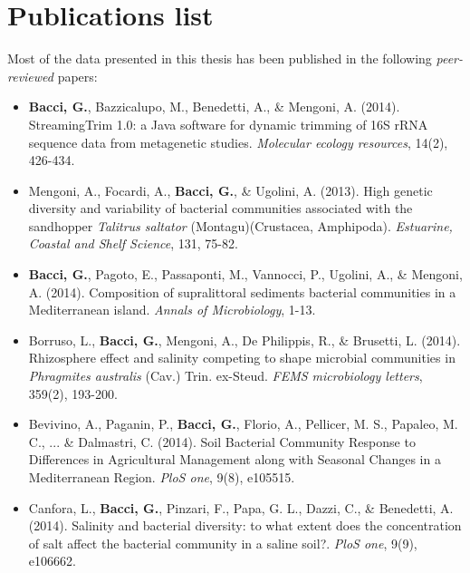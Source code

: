 
\chapter{Publications list}

Most of the data presented in this thesis has been published in the following \textit{peer-reviewed} papers:
\begin{itemize}

\item \textbf{Bacci, G.}, Bazzicalupo, M., Benedetti, A., \& Mengoni, A. (2014). StreamingTrim 1.0: a Java software for dynamic trimming of 16S rRNA sequence data from metagenetic studies. \textit{Molecular ecology resources}, 14(2), 426-434.

\item Mengoni, A., Focardi, A., \textbf{Bacci, G.}, \& Ugolini, A. (2013). High genetic diversity and variability of bacterial communities associated with the sandhopper \textit{Talitrus saltator} (Montagu)(Crustacea, Amphipoda). \textit{Estuarine, Coastal and Shelf Science}, 131, 75-82.

\item \textbf{Bacci, G.}, Pagoto, E., Passaponti, M., Vannocci, P., Ugolini, A., \& Mengoni, A. (2014). Composition of supralittoral sediments bacterial communities in a Mediterranean island. \textit{Annals of Microbiology}, 1-13.

\item Borruso, L., \textbf{Bacci, G.}, Mengoni, A., De Philippis, R., \& Brusetti, L. (2014). Rhizosphere effect and salinity competing to shape microbial communities in \textit{Phragmites australis} (Cav.) Trin. ex-Steud. \textit{FEMS microbiology letters}, 359(2), 193-200.

\item Bevivino, A., Paganin, P., \textbf{Bacci, G.}, Florio, A., Pellicer, M. S., Papaleo, M. C., ... \& Dalmastri, C. (2014). Soil Bacterial Community Response to Differences in Agricultural Management along with Seasonal Changes in a Mediterranean Region. \textit{PloS one}, 9(8), e105515.

\item Canfora, L., \textbf{Bacci, G.}, Pinzari, F., Papa, G. L., Dazzi, C., \& Benedetti, A. (2014). Salinity and bacterial diversity: to what extent does the concentration of salt affect the bacterial community in a saline soil?. \textit{PloS one}, 9(9), e106662.


\end{itemize}
